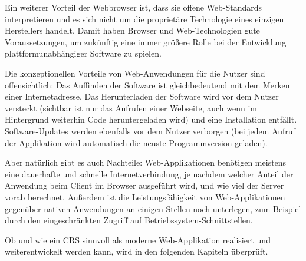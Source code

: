 Ein weiterer Vorteil der Webbrowser ist, dass sie offene Web-Standards interpretieren und es sich nicht um die proprietäre Technologie eines einzigen Herstellers handelt. Damit haben Browser und Web-Technologien gute Voraussetzungen, um zukünftig eine immer größere Rolle bei der Entwicklung plattformunabhängiger Software zu spielen.

Die konzeptionellen Vorteile von Web-Anwendungen für die Nutzer sind offensichtlich: Das Auffinden der Software ist gleichbedeutend mit dem Merken einer Internetadresse. Das Herunterladen der Software wird vor dem Nutzer versteckt (sichtbar ist nur das Aufrufen einer Webseite, auch wenn im Hintergrund weiterhin Code heruntergeladen wird) und eine Installation entfällt. Software-Updates werden ebenfalls vor dem Nutzer verborgen (bei jedem Aufruf der Applikation wird automatisch die neuste Programmversion geladen).

Aber natürlich gibt es auch Nachteile: Web-Applikationen benötigen meistens eine dauerhafte und schnelle Internetverbindung, je nachdem welcher Anteil der Anwendung beim Client im Browser ausgeführt wird, und wie viel der Server vorab berechnet. Außerdem ist die Leistungsfähigkeit von Web-Applikationen gegenüber nativen Anwendungen an einigen Stellen noch unterlegen, zum Beispiel durch den eingeschränkten Zugriff auf Betriebssystem-Schnittstellen.

Ob und wie ein CRS sinnvoll als moderne Web-Applikation realisiert und weiterentwickelt werden kann, wird in den folgenden Kapiteln überprüft.

